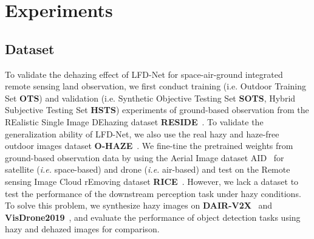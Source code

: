 \documentclass[lettersize,journal]{IEEEtran}
\begin{document}
\section{Experiments}
\subsection{Dataset}
To validate the dehazing effect of LFD-Net for space-air-ground integrated remote sensing land observation, we first conduct training (i.e. Outdoor Training Set \textbf{OTS}) and validation (i.e. Synthetic Objective Testing Set \textbf{SOTS}, Hybrid Subjective Testing Set \textbf{HSTS}) experiments of ground-based observation from the REalistic Single Image DEhazing dataset \textbf{RESIDE}~\cite{li2018reside}. To validate the generalization ability of LFD-Net, we also use the real hazy and haze-free outdoor images dataset \textbf{O-HAZE}~\cite{ancuti2018ohaze}. We fine-tine the pretrained weights from ground-based observation data by using the Aerial Image dataset AID~\cite{xia2017aid} for satellite (\textit{i.e.} space-based) and drone (\textit{i.e.} air-based) and test on the Remote sensing Image Cloud rEmoving dataset \textbf{RICE}~\cite{lin2019rice}. However, we lack a dataset to test the performance of the downstream perception task under hazy conditions. To solve this problem, 
we synthesize hazy images on \textbf{DAIR-V2X}~\cite{yu2022dair} and \textbf{VisDrone2019}~\cite{du2019visdrone}, and evaluate the performance of object detection tasks using hazy and dehazed images for comparison.


\end{document}
